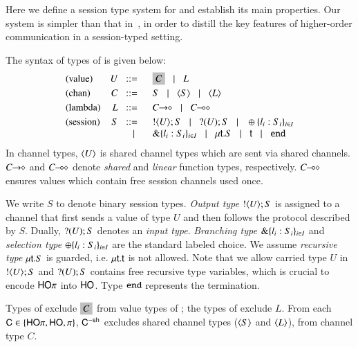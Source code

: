 \noi Here we define a session type system for
\HOp and establish its main properties. 
Our system is simpler than that in~\cite{tlca07,mostrous_phd}, in order to distill the key
features of higher-order communication in a session-typed setting.

The syntax of types of \HOp is given below: 
\[
\begin{array}{lrl}
\text{(value)}	& U \bnfis &	\nonhosyntax{C} \bnfbar L\\[1mm]  %
\text{(chan)}   & C  \bnfis &	S \bnfbar \chtype{S}\bnfbar \chtype{L}
	\\[1mm]
\text{(lambda)} & L \bnfis &	\shot{C} \bnfbar \lhot{C}
	\\[1mm]
\text{(session)} &  S \bnfis & 	\btout{U} S \bnfbar \btinp{U} S 
\bnfbar \btsel{l_i:S_i}_{i \in I} \\ 
 & \bnfbar & \btbra{l_i:S_i}_{i \in I}
	  \bnfbar  \trec{t}{S} \bnfbar \vart{t}  \bnfbar \tinact
\end{array}
\]
In channel types, $\langle U \rangle$ is shared channel types 
which are sent via shared channels. 
$C\!\! \rightarrow\!\! \diamond$ and $C\!\! \multimap\!\! \diamond$ denote
{\em shared} and {\em linear} function types, respectively.
$C\!\! \multimap\!\! \diamond$ \cite{tlca07,mostrous_phd} ensures values which contain free 
session channels used once. 
 
We write $S$ to denote binary session types.  {\em Output type}
$! \langle U \rangle ; S$ is assigned to a channel that first sends a value of
type $U$ and then follows the protocol described by $S$.  Dually,
$? (U) ; S$ denotes an {\em input type}.  {\em Branching type}
$\& \{l_i:S_i\}_{i \in I}$ and {\em selection type}
$\oplus \{l_i:S_i\}_{i \in I}$ are the standard labeled choice.  We assume {\em recursive
  type} $\mu\mathsf{t}.S$ is guarded, i.e.  $\mu\mathsf{t}.\mathsf{t}$ is not
allowed.  Note that we allow carried type $U$ in $! \langle U \rangle ; S$ and
$? (U) ; S$ contains free recursive type variables, which is crucial
to encode $\mathsf{HO}\pi$ into $\mathsf{HO}$. Type $\mathtt{end}$ represents the
termination. 

Types of \HO exclude $\nonhosyntax{C}$ from 
value types of \HOp; the types of \sessp exclude $L$. 
From each $\mathsf{C} \in \{\mathsf{HO}\pi, \mathsf{HO}, \pi \}$, $\mathsf{C}^{-\mathsf{sh}}$ 
excludes shared channel types ($\langle S \rangle$ and $\langle L \rangle$), 
from channel type $C$.

